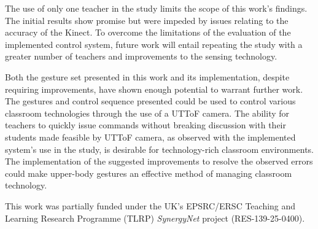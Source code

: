 \documentclass[manuscript, review, screen]{acmart}
\begin{document}
The use of only one teacher in the study limits the scope of this work's findings.
The initial results show promise but were impeded by issues relating to the accuracy of the Kinect.
To overcome the limitations of the evaluation of the implemented control system, future work will entail repeating the study with a greater number of teachers and improvements to the sensing technology.

Both the gesture set presented in this work and its implementation, despite requiring improvements, have shown enough potential to warrant further work.
The gestures and control sequence presented could be used to control various classroom technologies through the use of a \ac{UTToF} camera.
The ability for teachers to quickly issue commands without breaking discussion with their students made feasible by \ac{UTToF} camera, as observed with the implemented system's use in the study, is desirable for technology-rich classroom environments.
The implementation of the suggested improvements to resolve the observed errors could make upper-body gestures an effective method of managing classroom technology.


\begin{acks}

This work was partially funded under the UK's EPSRC/ERSC Teaching and Learning Research Programme (TLRP) {\emph{SynergyNet}} project (RES-139-25-0400).

\end{acks}



\end{document}
